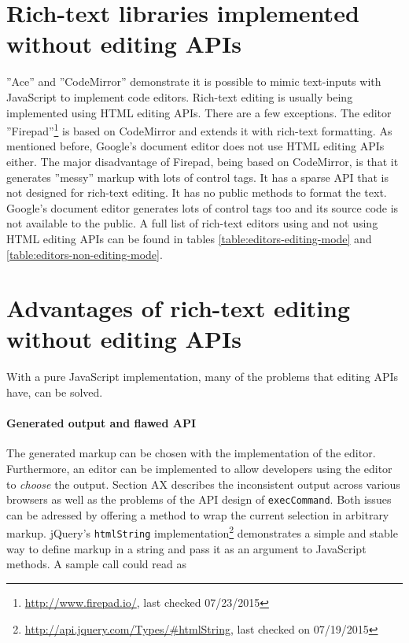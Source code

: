\section{Rich-text libraries implemented without editing APIs}

''Ace'' and ''CodeMirror'' demonstrate it is possible to mimic text-inputs with JavaScript to implement code editors. Rich-text editing is usually being implemented using HTML editing APIs. There are a few exceptions. The editor ''Firepad''\footnote{\url{http://www.firepad.io/}, last checked 07/23/2015} is based on CodeMirror and extends it with rich-text formatting. As mentioned before, Google's document editor does not use HTML editing APIs either. The major disadvantage of Firepad, being based on CodeMirror, is that it generates ''messy'' markup with lots of control tags. It has a sparse API that is not designed for rich-text editing. It has no public methods to format the text. Google's document editor generates lots of control tags too and its source code is not available to the public. A full list of rich-text editors using and not using HTML editing APIs can be found in tables \ref{table:editors-editing-mode} and \ref{table:editors-non-editing-mode}.

\section{Advantages of rich-text editing without editing APIs}

With a pure JavaScript implementation, many of the problems that editing APIs have, can be solved.

\paragraph{Generated output and flawed API} The generated markup can be chosen with the implementation of the editor. Furthermore, an editor can be implemented to allow developers using the editor to \textit{choose} the output. Section AX describes the inconsistent output across various browsers as well as the problems of the API design of \texttt{execCommand}. Both issues can be adressed by offering a method to wrap the current selection in arbitrary markup. jQuery's \texttt{htmlString} implementation\footnote{\url{http://api.jquery.com/Types/\#htmlString}, last checked on 07/19/2015} demonstrates a simple and stable way to define markup in a string and pass it as an argument to JavaScript methods. A sample call could read as

